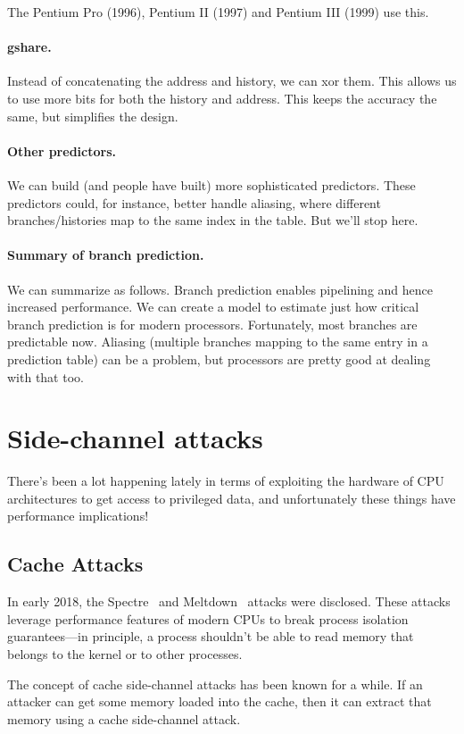 \documentclass[a4paper]{report}
\begin{document}
The Pentium Pro (1996), Pentium II (1997) and Pentium III (1999) use this.

\paragraph{gshare.}
Instead of concatenating the address and history, we can xor them. This allows
us to use more bits for both the history and address. This keeps the accuracy the same,
but simplifies the design.

\paragraph{Other predictors.} We can build (and people have built) more sophisticated predictors.
These predictors could, for instance, better handle aliasing, where
different branches/histories map to the same index in the table. But we'll stop here.

\paragraph{Summary of branch prediction.} We can summarize as follows.
Branch prediction enables pipelining and hence increased performance.
We can create a model to estimate just how critical branch prediction
is for modern processors. Fortunately, most branches are predictable
now. Aliasing (multiple branches mapping to the same entry in a
prediction table) can be a problem, but processors are pretty good at
dealing with that too.

\section*{Side-channel attacks}
There's been a lot happening lately in terms of exploiting the hardware of CPU architectures to get access to privileged data, and unfortunately these things have performance implications!

\subsection*{Cache Attacks}
In early 2018, the Spectre~\cite{Kocher2018spectre} and Meltdown~\cite{Lipp2018meltdown} attacks were disclosed. These attacks leverage performance features of modern CPUs to break process isolation guarantees---in principle, a process shouldn't be able to read memory that belongs to the kernel or to other processes.

The concept of cache side-channel attacks has been known for a while. If an attacker can get some memory loaded into the cache, then it can extract that memory using a cache side-channel attack.
\end{document}
